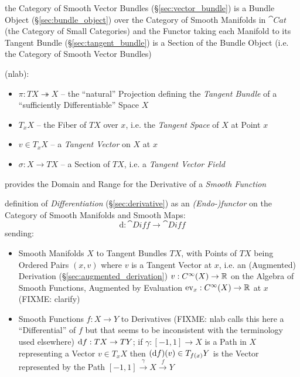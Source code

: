 the Category of Smooth Vector Bundles (\S\ref{sec:vector_bundle}) is a Bundle
Object (\S\ref{sec:bundle_object}) over the Category of Smooth Manifolds in
$\cat{Cat}$ (the Category of Small Categories) and the Functor taking each
Manifold to its Tangent Bundle (\S\ref{sec:tangent_bundle}) is a Section of the
Bundle Object (i.e. the Category of Smooth Vector Bundles)

(nlab):

\begin{itemize}
  \item $\pi : T X \twoheadrightarrow X$ -- the ``natural'' Projection defining
    the \emph{Tangent Bundle} of a ``sufficiently Differentiable'' Space $X$
  \item $T_x X$ -- the Fiber of $T X$ over $x$, i.e. the \emph{Tangent Space} of
    $X$ at Point $x$
  \item $v \in T_x X$ -- a \emph{Tangent Vector} on $X$ at $x$
  \item $\sigma : X \rightarrow T X$ -- a Section of $T X$, i.e. a
    \emph{Tangent Vector Field}
\end{itemize}

provides the Domain and Range for the Derivative of a \emph{Smooth Function}

definition of \emph{Differentiation} (\S\ref{sec:derivative}) as an
\emph{(Endo-)functor} on the Category of Smooth Manifolds and Smooth Maps:
\[
  \mathrm{d} : \cat{Diff} \rightarrow \cat{Diff}
\]
sending:
\begin{itemize}
  \item Smooth Manifolds $X$ to Tangent Bundles $T X$, with Points of $T X$
    being Ordered Pairs $(x, v)$ where $v$ is a Tangent Vector at $x$, i.e. an
    (Augmented) Derivation (\S\ref{sec:augmented_derivation}) $v : C^\infty(X)
    \rightarrow \mathbb{R}$ on the Algebra of Smooth Functions, Augmented by
    Evaluation $\mathrm{ev}_x : C^\infty(X) \rightarrow \mathbb{R}$ at $x$
    (FIXME: clarify)
  \item Smooth Functions $f : X \rightarrow Y$ to Derivatives (FIXME: nlab calls
    this here a ``Differential'' of $f$ but that seems to be inconsistent with
    the terminology used elsewhere) $\mathrm{d}f : TX \rightarrow TY$; if $\gamma
    : [-1,1] \rightarrow X$ is a Path in $X$ representing a Vector
    $v \in T_x{X}$ then $(\mathrm{d}f)(v) \in T_{f(x)}Y$ is the Vector represented
    by the Path $[-1, 1] \xrightarrow{\gamma} X \xrightarrow{f} Y$
\end{itemize}

